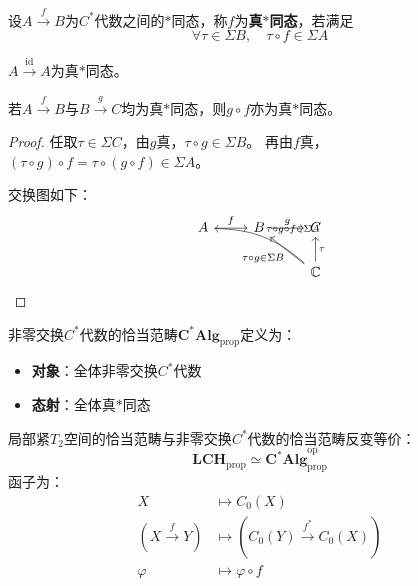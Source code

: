\documentclass[lang=cn,a4paper,newtx,section]{elegantbook}
\begin{document}
\begin{definition}[真$*$同态]
  设$A \xrightarrow{f} B$为$C^*$代数之间的$*$同态，称$f$为\textbf{真$*$同态}，若满足
  \begin{equation*}
    \forall \tau \in \Sigma B, \quad \tau \circ f \in \Sigma A
  \end{equation*}
\end{definition}

\begin{proposition}
  $A \xrightarrow{\mathrm{id}} A$为真$*$同态。
\end{proposition}

\begin{proposition}
  若$A \xrightarrow{f} B$与$B \xrightarrow{g} C$均为真$*$同态，则$g \circ f$亦为真$*$同态。
\end{proposition}

\begin{proof}
  任取$\tau \in \Sigma C$，由$g$真，$\tau \circ g \in \Sigma B$。
  再由$f$真，$(\tau \circ g) \circ f = \tau \circ (g \circ f) \in \Sigma A$。
  
  交换图如下：
  \begin{equation*}
    \begin{tikzcd}
      A \arrow[r, "f"] & B \arrow[r, "g"] & C \\
      & & \mathbb{C} \arrow[u, "\tau"'] \arrow[ul, "\tau \circ g \in \Sigma B"] \arrow[ull, bend right=20, "\tau \circ g \circ f \in \Sigma A"']
    \end{tikzcd}
  \end{equation*}
\end{proof}

\begin{definition}
  非零交换$C^*$代数的恰当范畴$\mathbf{C^*Alg}_{\mathrm{prop}}$定义为：
  \begin{itemize}
    \item \textbf{对象}：全体非零交换$C^*$代数
    \item \textbf{态射}：全体真$*$同态
  \end{itemize}
\end{definition}

\begin{proposition}[范畴等价]
  局部紧$T_2$空间的恰当范畴与非零交换$C^*$代数的恰当范畴反变等价：
  \begin{equation*}
    \mathbf{LCH}_{\mathrm{prop}} \simeq \mathbf{C^*Alg}_{\mathrm{prop}}^{\mathrm{op}}
  \end{equation*}
  函子为：
  \begin{equation*}
    \begin{aligned}
      X &\longmapsto C_0(X) \\
      \left(X \xrightarrow{f} Y\right) &\longmapsto \left(C_0(Y) \xrightarrow{f^*} C_0(X)\right) \\
      \varphi &\longmapsto \varphi \circ f
    \end{aligned}
  \end{equation*}
\end{proposition}
\end{document}
